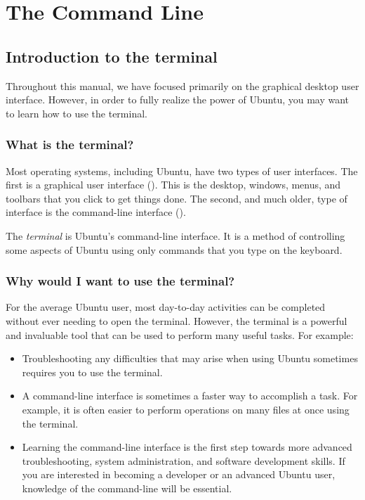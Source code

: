 \chapter{The Command Line}
\label{ch:command-line}

\section{Introduction to the terminal}

Throughout this manual, we have focused primarily on the graphical desktop
user interface. However, in order to fully realize the power of Ubuntu,
you may want to learn how to use the terminal.

\subsection{What is the terminal?}

Most operating systems, including Ubuntu, have two types of user interfaces.
The first is a graphical user interface (). This is 
the desktop, windows, menus, and toolbars that you click to get things done. 
The second, and much older, type of interface is the command-line interface
().

The \emph{terminal} is Ubuntu's command-line interface. It is a method of 
controlling some aspects of Ubuntu using only commands that you type on the
keyboard.

\subsection{Why would I want to use the terminal?}

For the average Ubuntu user, most day-to-day activities can be completed without ever needing to open the terminal. However, the terminal is a powerful and invaluable tool that can be used to perform many useful tasks. For example:

\begin{itemize}
  \item Troubleshooting any difficulties that may arise when using Ubuntu sometimes requires you to use the terminal.
  \item A command-line interface is sometimes a faster way to accomplish a 
task. For example, it is often easier to perform operations on many files at
once using the terminal.
  \item Learning the command-line interface is the first step towards more advanced 
troubleshooting, system administration, and software development skills. If you are interested in becoming a developer or an advanced Ubuntu user, knowledge of the command-line will be essential. 
\end{itemize}

